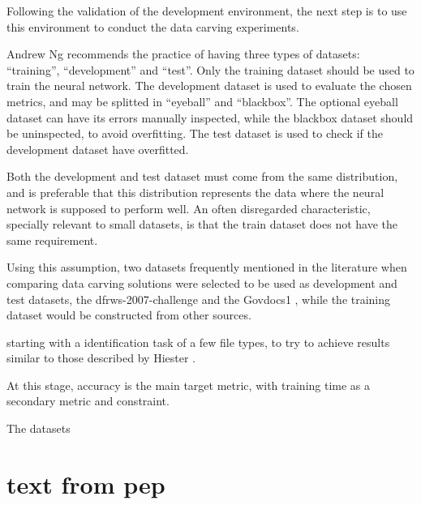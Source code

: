Following the validation of the development environment, the next step is to use this environment to conduct the data carving experiments.

Andrew Ng recommends the practice of having three types of datasets: ``training'', ``development'' and ``test''. Only the training dataset should be used to train the neural network. The development dataset is used to evaluate the chosen metrics, and may be splitted in ``eyeball'' and ``blackbox''. The optional eyeball dataset can have its errors manually inspected, while the blackbox dataset should be uninspected, to avoid overfitting. The test dataset is used to check if the development dataset have overfitted.

Both the development and test dataset must come from the same distribution, and is preferable that this distribution represents the data where the neural network is supposed to perform well. An often disregarded characteristic, specially relevant to small datasets, is that the train dataset does not have the same requirement.

Using this assumption, two datasets frequently mentioned in the literature when comparing data carving solutions were selected to be used as development and test datasets, the dfrws-2007-challenge  and the Govdocs1 , while the training dataset would be constructed from other sources.



starting with a identification task of a few file types, to try to achieve results similar to those described by Hiester \cite{hiester_file_2018}.

At this stage, accuracy is the main target metric, with training time as a secondary metric and constraint.


The datasets 





\section{text from pep}



